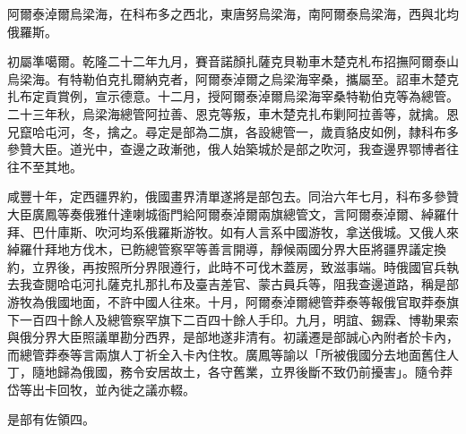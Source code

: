 \begin{pinyinscope}
阿爾泰淖爾烏梁海，在科布多之西北，東唐努烏梁海，南阿爾泰烏梁海，西與北均俄羅斯。

初屬準噶爾。乾隆二十二年九月，賽音諾顏扎薩克貝勒車木楚克札布招撫阿爾泰山烏梁海。有特勒伯克扎爾納克者，阿爾泰淖爾之烏梁海宰桑，攜屬至。詔車木楚克扎布定貢賞例，宣示德意。十二月，授阿爾泰淖爾烏梁海宰桑特勒伯克等為總管。二十三年秋，烏梁海總管阿拉善、恩克等叛，車木楚克扎布剿阿拉善等，就擒。恩兄竄哈屯河，冬，擒之。尋定是部為二旗，各設總管一，歲貢貉皮如例，隸科布多參贊大臣。道光中，查邊之政漸弛，俄人始築城於是部之吹河，我查邊界鄂博者往往不至其地。

咸豐十年，定西疆界約，俄國畫界清單遂將是部包去。同治六年七月，科布多參贊大臣廣鳳等奏俄雅什達喇城衙門給阿爾泰淖爾兩旗總管文，言阿爾泰淖爾、綽羅什拜、巴什庫斯、吹河均系俄羅斯游牧。如有人言系中國游牧，拿送俄城。又俄人來綽羅什拜地方伐木，已飭總管察罕等善言開導，靜候兩國分界大臣將疆界議定換約，立界後，再按照所分界限遵行，此時不可伐木蓋房，致滋事端。時俄國官兵執去我查閱哈屯河扎薩克扎那扎布及臺吉差官、蒙古員兵等，阻我查邊道路，稱是部游牧為俄國地面，不許中國人往來。十月，阿爾泰淖爾總管莽泰等報俄官取莽泰旗下一百四十餘人及總管察罕旗下二百四十餘人手印。九月，明誼、錫霖、博勒果索與俄分界大臣照議單勘分西界，是部地遂非清有。初議遷是部誠心內附者於卡內，而總管莽泰等言兩旗人丁祈全入卡內住牧。廣鳳等諭以「所被俄國分去地面舊住人丁，隨地歸為俄國，務令安居故土，各守舊業，立界後斷不致仍前擾害」。隨令莽岱等出卡回牧，並內徙之議亦輟。

是部有佐領四。


\end{pinyinscope}